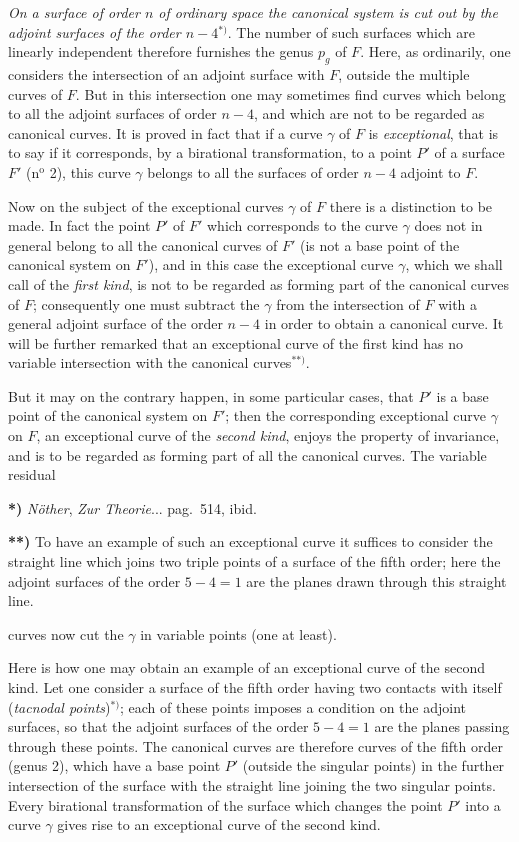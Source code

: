 \documentclass{article}
\begin{document}
\emph{On a surface of order $n$ of ordinary space the canonical system is cut out by the adjoint surfaces of the order $n-4$}${}^{*)}$. The number of such surfaces which are linearly independent therefore furnishes the genus $p_{g}$ of $F$. Here, as ordinarily, one considers the intersection of an adjoint surface with $F$, outside the multiple curves of $F$. But in this intersection one may sometimes find curves which belong to all the adjoint surfaces of order $n-4$, and which are not to be regarded as canonical curves. It is proved in fact that if a curve $\gamma$ of $F$ is \emph{exceptional}, that is to say if it corresponds, by a birational transformation, to a point $P'$ of a surface $F'$ (n${}^{\text{o}}$ 2), this curve $\gamma$ belongs to all the surfaces of order $n-4$ adjoint to $F$.

Now on the subject of the exceptional curves $\gamma$ of $F$ there is a distinction to be made. In fact the point $P'$ of $F'$ which corresponds to the curve $\gamma$ does not in general belong to all the canonical curves of $F'$ (is not a base point of the canonical system on $F'$), and in this case the exceptional curve $\gamma$, which we shall call of the \emph{first kind}, is not to be regarded as forming part of the canonical curves of $F$; consequently one must subtract the $\gamma$ from the intersection of $F$ with a general adjoint surface of the order $n-4$ in order to obtain a canonical curve. It will be further remarked that an exceptional curve of the first kind has no variable intersection with the canonical curves${}^{**)}$.

But it may on the contrary happen, in some particular cases, that $P'$ is a base point of the canonical system on $F'$; then the corresponding exceptional curve $\gamma$ on $F$, an exceptional curve of the \emph{second kind}, enjoys the property of invariance, and is to be regarded as forming part of all the canonical curves. The variable residual

\textbf{*)} \emph{Nöther}, \emph{Zur Theorie}... pag.\ 514, ibid.

\textbf{**)} To have an example of such an exceptional curve it suffices to consider the straight line which joins two triple points of a surface of the fifth order; here the adjoint surfaces of the order $5-4=1$ are the planes drawn through this straight line.

curves now cut the $\gamma$ in variable points (one at least).

Here is how one may obtain an example of an exceptional curve of the second kind. Let one consider a surface of the fifth order having two contacts with itself (\emph{tacnodal points})${}^{*)}$; each of these points imposes a condition on the adjoint surfaces, so that the adjoint surfaces of the order $5-4=1$ are the planes passing through these points. The canonical curves are therefore curves of the fifth order (genus 2), which have a base point $P'$ (outside the singular points) in the further intersection of the surface with the straight line joining the two singular points. Every birational transformation of the surface which changes the point $P'$ into a curve $\gamma$ gives rise to an exceptional curve of the second kind.
\end{document}
